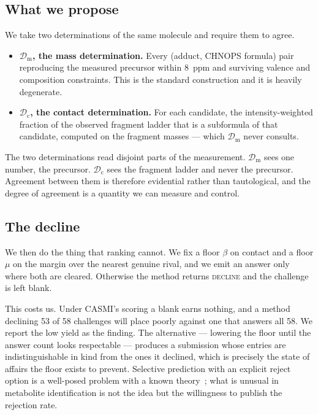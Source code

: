 \documentclass[11pt,twocolumn,a4paper]{article}
\theoremstyle{definition}
\theoremstyle{remark}
\newcommand{\Dmass}{\mathcal{D}_{\mathrm{m}}}
\newcommand{\Dcon}{\mathcal{D}_{\mathrm{c}}}
\newcommand{\declineword}{\textsc{decline}}
\begin{document}
\subsection{What we propose}

We take two determinations of the same molecule and require them to agree.

\begin{itemize}[leftmargin=1.4em]
\item \textbf{$\Dmass$, the mass determination.} Every (adduct, CHNOPS formula)
pair reproducing the measured precursor within 8~ppm and surviving valence and
composition constraints. This is the standard construction and it is heavily
degenerate.
\item \textbf{$\Dcon$, the contact determination.} For each candidate, the
intensity-weighted fraction of the observed fragment ladder that is a subformula
of that candidate, computed on the fragment masses --- which $\Dmass$ never
consults.
\end{itemize}

The two determinations read disjoint parts of the measurement. $\Dmass$ sees one
number, the precursor. $\Dcon$ sees the fragment ladder and never the precursor.
Agreement between them is therefore evidential rather than tautological, and the
degree of agreement is a quantity we can measure and control.

\subsection{The decline}

We then do the thing that ranking cannot. We fix a floor $\beta$ on contact and a
floor $\mu$ on the margin over the nearest genuine rival, and we emit an answer
only where both are cleared. Otherwise the method returns \declineword{} and the
challenge is left blank.

This costs us. Under CASMI's scoring a blank earns nothing, and a method
declining 53 of 58 challenges will place poorly against one that answers all 58.
We report the low yield as the finding. The alternative --- lowering the floor
until the answer count looks respectable --- produces a submission whose entries
are indistinguishable in kind from the ones it declined, which is precisely the
state of affairs the floor exists to prevent. Selective prediction with an
explicit reject option is a well-posed problem with a known
theory~\citep{chow2008reject,herbei2006classification}; what is unusual in
metabolite identification is not the idea but the willingness to publish the
rejection rate.
\end{document}
